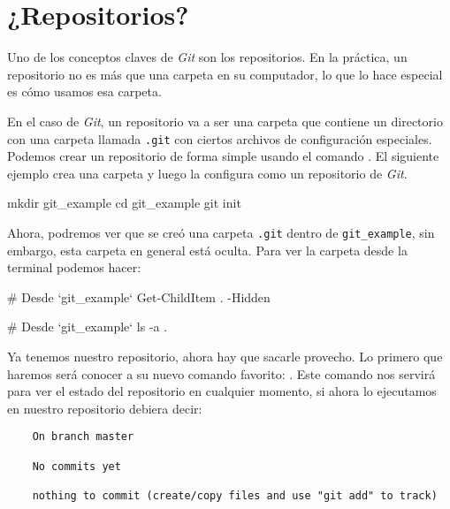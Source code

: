 \section{¿Repositorios?}
  Uno de los conceptos claves de \textit{Git} son los repositorios.
  En la práctica, un repositorio no es más que una carpeta en su computador, lo que lo hace especial
  es cómo usamos esa carpeta.

  En el caso de \textit{Git}, un repositorio va a ser una carpeta que contiene un directorio con una
  carpeta llamada \texttt{.git} con ciertos archivos de configuración especiales.
  Podemos crear un repositorio de forma simple usando el comando .
  El siguiente ejemplo crea una carpeta y luego la configura como un repositorio de \textit{Git}.

  \begin{powershell}
    mkdir git_example
    cd git_example
    git init
  \end{powershell}

  Ahora, podremos ver que se creó una carpeta \texttt{.git} dentro de \texttt{git\_example}, sin 
  embargo, esta carpeta en general está oculta.
  Para ver la carpeta desde la terminal podemos hacer:
  
  \begin{tcolorbox}[enhanced, breakable, title=Powershell]
    \begin{powershell}
      # Desde `git_example`
      Get-ChildItem . -Hidden
    \end{powershell}
  \end{tcolorbox}

  \begin{tcolorbox}[enhanced, breakable, title=Bash]
    \begin{bash}
      # Desde `git_example`
      ls -a .
    \end{bash}
  \end{tcolorbox}

  Ya tenemos nuestro repositorio, ahora hay que sacarle provecho.
  Lo primero que haremos será conocer a su nuevo comando favorito: 
  .
  Este comando nos servirá para ver el estado del repositorio en cualquier momento, si ahora lo 
  ejecutamos en nuestro repositorio debiera decir:
  \begin{verbatim}
    On branch master

    No commits yet

    nothing to commit (create/copy files and use "git add" to track)
  \end{verbatim}

